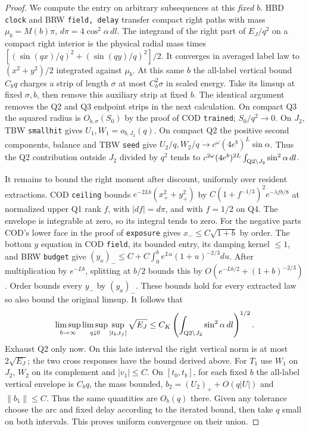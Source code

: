 \documentclass[11pt]{article}
\newcommand{\dd}{\,dl}
\begin{document}
\begin{proof}
We compute the entry on arbitrary subsequences at this \emph{fixed} $b$. HBD \texttt{clock} and BRW \texttt{field, delay} transfer compact right paths with mass $\mu_b=M(b)\pi$, $d\pi=4\cos^2\alpha\,dl$. The integrand of the right part of $E_J/q^2$ on a compact right interior is the physical radial mass times
$[(\sin(qx)/q)^2+(\sin(qy)/q)^2]/2$. It converges in averaged label law to $(x^2+y^2)/2$ integrated against $\mu_b$. At this same $b$ the all-label vertical bound $C_b q$ charges a strip of length $\sigma$ at most $C_b^2\sigma$ in scaled energy. Take its limsup at fixed $\sigma,b$, then remove this auxiliary strip at fixed $b$. The identical argument removes the Q2 and Q3 endpoint strips in the next calculation. On compact Q3 the squared radius is $O_{b,\sigma}(S_0)$ by the proof of COD \texttt{trained}; $S_0/q^2\to0$. On $J_2$, TBW \texttt{smallhit} gives $U_1,W_1=o_{b,J_2}(q)$. On compact Q2 the positive second components, balance and TBW \texttt{seed} give
$U_2/q,W_2/q\to c^\omega(4e^b)^L\sin\alpha$. Thus the Q2 contribution outside $J_2$ divided by $q^2$ tends to $c^{2\omega}(4e^b)^{2L}\int_{{\rm Q2}\setminus J_2}\sin^2\alpha\dd$.

It remains to bound the right moment after discount, uniformly over resident extractions. COD \texttt{ceiling} bounds $e^{-2Lb}(x_+^2+y_+^2)$ by $C(1+f^{-1/3})^2 e^{-\lambda fb/8}$ at normalized upper Q1 rank $f$, with $|df|=d\pi$, and with $f=1/2$ on Q4. The envelope is integrable at zero, so its integral tends to zero. For the negative parts COD's lower face in the proof of \texttt{exposure} gives $x_-\le C\sqrt{1+b}$ by order. The bottom $y$ equation in COD \texttt{field}, its bounded entry, its damping kernel $\le1$, and BRW \texttt{budget} give $(y_a)_-\le C+C\int_0^b e^{Lu}(1+u)^{-2/3}du$. After multiplication by $e^{-Lb}$, splitting at $b/2$ bounds this by $O(e^{-Lb/2}+(1+b)^{-2/3})$. Order bounds every $y_-$ by $(y_a)_-$. These bounds hold for every extracted law so also bound the original limsup. It follows that
\[
 \limsup_{b\to\infty}\limsup_{q\downarrow0}
 \sup_{[t_b,t_f]}\sqrt{E_J}
 \le C_K\left(\int_{{\rm Q2}\setminus J_2}\sin^2\alpha\dd\right)^{1/2}.
\]
Exhaust Q2 only now. On this late interval the right vertical norm is at most $2\sqrt{E_J}$; the two cross responses have the bound derived above. For $T_1$ use $W_1$ on $J_2$, $W_2$ on its complement and $|v_1|\le C$. On $[t_0,t_b]$, for each fixed $b$ the all-label vertical envelope is $C_bq$, the mass bounded, $b_2=(U_2)_++O(q|U|)$ and $\|b_1\|\le C$. Thus the same quantities are $O_b(q)$ there. Given any tolerance choose the arc and fixed delay according to the iterated bound, then take $q$ small on both intervals. This proves uniform convergence on their union.
\end{proof}
\end{document}
